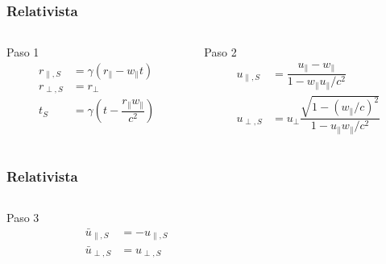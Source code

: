 \documentclass{beamer}
\begin{document}
\begin{frame}[t]
    \frametitle[prueb1]{Relativista}
    \begin{columns}
        \begin{column}{0.5\textwidth}
            \begin{block}{Paso 1}
                \begin{align*}
                    r_{\parallel,S} &= \gamma\left( r_\parallel - w_\parallel t \right) \nonumber\\
                    r_{\perp, S} &= r_\perp  \\
                    t_S &= \gamma\left( t - \dfrac{r_\parallel w_\parallel}{c^2} \right) \nonumber
                \end{align*}
                \vspace{5.5mm}
            \end{block}
        \end{column}
        \begin{column}{0.5\textwidth}
            \begin{block}{Paso 2}
                \begin{align*}
                    u_{\parallel,S} &= \dfrac{u_\parallel - w_\parallel}{1 - w_\parallel u_\parallel / c^2} \\[5mm]
                    u_{\perp,S} &= u_\perp\dfrac{\sqrt{1 - {(w_\parallel/c)}^2}}{1 - u_\parallel w_\parallel / c^2} 
                \end{align*}
            \end{block}
        \end{column}
    \end{columns}
\end{frame}

\begin{frame}[t]
    \frametitle[prueb1]{Relativista}
    \begin{columns}
        \begin{column}{0.5\textwidth}
            \begin{block}{Paso 3}
                \begin{align*}
                    \bar{u}_{\parallel, S} &= -u_{\parallel, S} \\[9.5mm]
                    \bar{u}_{\perp, S} &= u_{\perp, S}
                \end{align*}
                \vspace{2.2mm}
            \end{block}
        \end{column}
        \begin{column}{0.5\textwidth}
        \end{column}
    \end{columns}
\end{frame}
\end{document}
